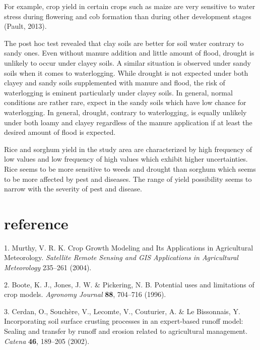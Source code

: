 \documentclass[12pt,oneside]{article}
\begin{document}
For example, crop yield in certain crops such as maize are very sensitive to water stress during flowering and cob formation than during other development stages (Pault, 2013).

The post hoc test revealed that clay soils are better for soil water contrary to sandy ones. Even without manure addition and little amount of flood, drought is unlikely to occur under clayey soils. A similar situation is observed under sandy soils when it comes to waterlogging. While drought is not expected under both clayey and sandy soils supplemented with manure and flood, the risk of waterlogging is eminent particularly under clayey soils. In general, normal conditions are rather rare, expect in the sandy soils which have low chance for waterlogging. In general, drought, contrary to waterlogging, is equally unlikely under both loamy and clayey regardless of the manure application if at least the desired amount of flood is expected.

Rice and sorghum yield in the study area are characterized by high frequency of low values and low frequency of high values which exhibit higher uncertainties. Rice seems to be more sensitive to weeds and drought than sorghum which seems to be more affected by pest and diseases. The range of yield possibility seems to narrow with the severity of pest and disease.

\hypertarget{VI}{%
\section*{reference}\label{VI}}

\hypertarget{refs}{}
\leavevmode\hypertarget{ref-Murthy_2004}{}%
1. Murthy, V. R. K. Crop Growth Modeling and Its Applications in Agricultural Meteorology. \emph{Satellite Remote Sensing and GIS Applications in Agricultural Meteorology} 235--261 (2004).

\leavevmode\hypertarget{ref-Boote_et_al_1996}{}%
2. Boote, K. J., Jones, J. W. \& Pickering, N. B. Potential uses and limitations of crop models. \emph{Agronomy Journal} \textbf{88}, 704--716 (1996).

\leavevmode\hypertarget{ref-Cerdan_et_al_2002}{}%
3. Cerdan, O., Souchère, V., Lecomte, V., Couturier, A. \& Le Bissonnais, Y. Incorporating soil surface crusting processes in an expert-based runoff model: Sealing and transfer by runoff and erosion related to agricultural management. \emph{Catena} \textbf{46}, 189--205 (2002).
\end{document}
